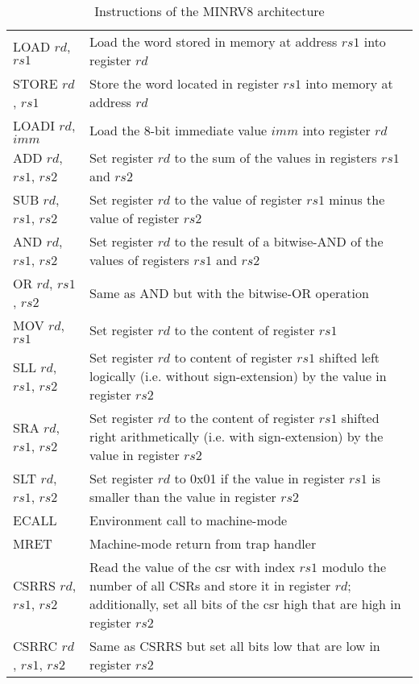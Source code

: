 \begin{table}
    \centering
    \begin{tabular}{|l p{10cm}|}
        \hline
        LOAD $ rd $, $ rs1 $ & Load the word stored in memory at address $ rs1 $ into register $ rd $ \\
        STORE $ rd $, $ rs1 $ & Store the word located in register $ rs1 $ into memory at address $ rd $ \\
        LOADI $ rd $, $ imm $ & Load the 8-bit immediate value $ imm $ into register $ rd $ \\
        ADD $ rd $, $ rs1 $, $ rs2 $ & Set register $ rd $ to the sum of the values in registers $ rs1 $ and $ rs2 $ \\
        SUB $ rd $, $ rs1 $, $ rs2 $ & Set register $ rd $ to the value of register $ rs1 $ minus the value of register $ rs2 $ \\
        AND $ rd $, $ rs1 $, $ rs2 $ & Set register $ rd $ to the result of a bitwise-AND of the values of registers $ rs1 $ and $ rs2 $ \\
        OR $ rd $, $ rs1 $, $ rs2 $ & Same as AND but with the bitwise-OR operation \\
        MOV $ rd $, $ rs1 $ & Set register $ rd $ to the content of register $ rs1 $ \\
        SLL $ rd $, $ rs1 $, $ rs2 $ & Set register $ rd $ to content of register $ rs1 $ shifted left logically (i.e. without sign-extension) by the value in register $ rs2 $ \\
        SRA $ rd $, $ rs1 $, $ rs2 $ & Set register $ rd $ to the content of register $ rs1 $ shifted right arithmetically (i.e. with sign-extension) by the value in register $ rs2 $ \\
        SLT $ rd $, $ rs1 $, $ rs2 $ & Set register $ rd $ to 0x01 if the value in register $ rs1 $ is smaller than the value in register $ rs2 $ \\
        ECALL & Environment call to machine-mode \\
        MRET & Machine-mode return from trap handler \\
        CSRRS $ rd $, $ rs1 $, $ rs2 $ & Read the value of the \gls{csr} with index $ rs1 $ modulo the number of all CSRs and store it in register $ rd $; additionally, set all bits of the \gls{csr} high that are high in register $ rs2 $ \\
        CSRRC $ rd $, $ rs1 $, $ rs2 $ & Same as CSRRS but set all bits low that are low in register $ rs2 $ \\
        \hline
    \end{tabular}
    \caption{Instructions of the MINRV8 architecture}
    \label{tbl:min-arch-instrs}
\end{table}

